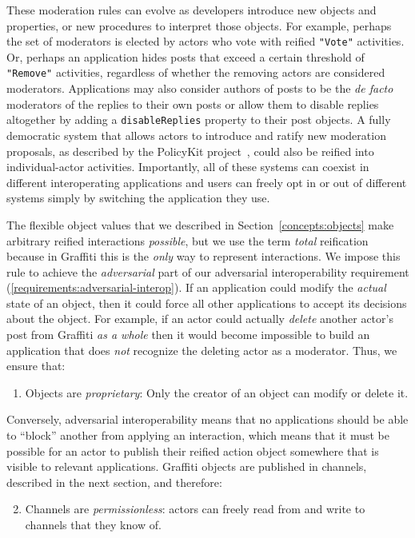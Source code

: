 These moderation rules can evolve as developers
introduce new objects and properties,
or new procedures to interpret those objects.
For example,
perhaps the set of moderators is elected by actors who vote with reified \texttt{"Vote"} activities.
Or, perhaps an application hides posts that exceed a certain threshold of \texttt{"Remove"} activities,
regardless of whether the removing actors are considered moderators.
Applications may also consider authors of posts to be the \emph{de facto} moderators of the replies to their
own posts or allow them to disable replies altogether by adding a \texttt{disableReplies}
property to their post objects.
A fully democratic system that allows actors to introduce and ratify new moderation proposals,
as described by the PolicyKit project~\cite{policykit}, could also be reified into
individual-actor activities.
Importantly, all of these systems can coexist in different interoperating
applications and users can freely opt in or out of different systems simply by switching
the application they use.

The flexible object values that we described in Section~\ref{concepts:objects} make arbitrary reified interactions \emph{possible}, but we use the term \emph{total} reification because in Graffiti this is the \emph{only} way to represent interactions.
We impose this rule to achieve the \emph{adversarial} part of our adversarial interoperability requirement (\ref{requirements:adversarial-interop}).
If an application could modify the \emph{actual} state of an object, then it could force all other applications to accept its decisions about the object.
For example, if an actor could actually \emph{delete} another actor's post
from Graffiti \emph{as a whole}
then it would become impossible to build
an application that does \emph{not} recognize the deleting actor as a moderator.
Thus, we ensure that:
\begin{enumerate}
\item
Objects are \emph{proprietary}: Only the creator of an object can modify or delete it.
\end{enumerate}
Conversely, adversarial interoperability means that no applications should be able to ``block'' another from applying an interaction, which means that it must be possible for an actor to publish
their reified action object somewhere that is visible
to relevant applications.
Graffiti objects are published in channels, described in the next
section, and therefore:
\begin{enumerate}
\setcounter{enumi}{1}
\item
Channels are \emph{permissionless}: actors can freely read from and write to channels that they know of.
\end{enumerate}

